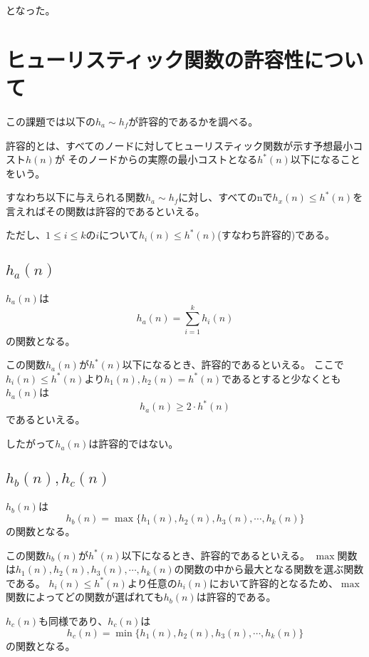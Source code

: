 \documentclass[a4paper,11pt,dvipdfmx]{jsarticle}
\begin{document}
となった。

\section{ヒューリスティック関数の許容性について}
この課題では以下の$h_a \sim h_f$が許容的であるかを調べる。

許容的とは、すべてのノードに対してヒューリスティック関数が示す予想最小コスト$h(n)$が
そのノードからの実際の最小コストとなる$h^*(n)$以下になることをいう。

すなわち以下に与えられる関数$h_a \sim h_f$に対し、すべてのnで$h_x(n) \leq h^*(n)$を言えればその関数は許容的であるといえる。

ただし、$1 \leq i \leq k$の$i$について$h_i(n) \leq h^*(n)$(すなわち許容的)である。
\subsection{$h_a(n)$}
$h_a(n)$は
\begin{equation*}
    h_a(n) = \sum_{i=1}^{k}h_i(n)
\end{equation*}
の関数となる。

この関数$h_a(n)$が$h^*(n)$以下になるとき、許容的であるといえる。
ここで$h_i(n) \leq h^*(n)$より$h_1(n), h_2(n) = h^*(n)$であるとすると少なくとも$h_a(n)$は
\begin{equation*}
    h_a(n) \geq 2 \cdot h^*(n)
\end{equation*}
であるといえる。

したがって$h_a(n)$は許容的ではない。

\subsection{$h_b(n),h_c(n)$}
$h_b(n)$は
\begin{equation*}
    h_b(n) = \max\{h_1(n),h_2(n),h_3(n),\cdots,h_k(n)\}
\end{equation*}
の関数となる。

この関数$h_b(n)$が$h^*(n)$以下になるとき、許容的であるといえる。
$\max$関数は$h_1(n),h_2(n),h_3(n),\cdots,h_k(n)$の関数の中から最大となる関数を選ぶ関数である。
$h_i(n) \leq h^*(n)$より任意の$h_i(n)$において許容的となるため、$\max$関数によってどの関数が選ばれても$h_b(n)$は許容的である。

$h_c(n)$も同様であり、$h_c(n)$は
\begin{equation*}
    h_c(n) = \min\{h_1(n),h_2(n),h_3(n),\cdots,h_k(n)\}
\end{equation*}
の関数となる。
\end{document}
